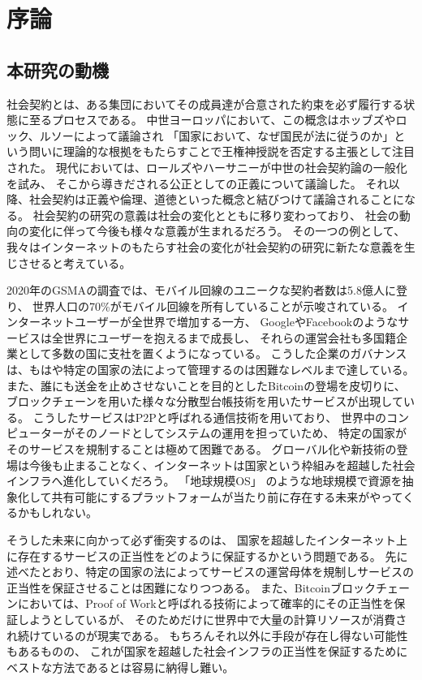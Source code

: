 \chapter{序論}
  \section{本研究の動機}
  \label{motivation}
  社会契約とは、ある集団においてその成員達が合意された約束を必ず履行する状態に至るプロセスである。
  中世ヨーロッパにおいて、この概念はホッブズやロック、ルソーによって議論され
  「国家において、なぜ国民が法に従うのか」という問いに理論的な根拠をもたらすことで王権神授説を否定する主張として注目された。
  現代においては、ロールズ\cite{rawls1971}やハーサニー\cite{harsanyi1955}が中世の社会契約論の一般化を試み、
  そこから導きだされる公正としての正義について議論した。
  それ以降、社会契約は正義や倫理、道徳といった概念と結びつけて議論されることになる。
  社会契約の研究の意義は社会の変化とともに移り変わっており、
  社会の動向の変化に伴って今後も様々な意義が生まれるだろう。
  その一つの例として、我々はインターネットのもたらす社会の変化が社会契約の研究に新たな意義を生じさせると考えている。

  2020年のGSMA\cite{gsma2020}の調査では、モバイル回線のユニークな契約者数は5.8億人に登り、
  世界人口の70\%がモバイル回線を所有していることが示唆されている。
  インターネットユーザーが全世界で増加する一方、
  Google\cite{google}やFacebook\cite{facebook}のようなサービスは全世界にユーザーを抱えるまで成長し、
  それらの運営会社も多国籍企業として多数の国に支社を置くようになっている。
  こうした企業のガバナンスは、もはや特定の国家の法によって管理するのは困難なレベルまで達している。
  また、誰にも送金を止めさせないことを目的としたBitcoin\cite{nakamoto2008bitcoin}の登場を皮切りに、
  ブロックチェーンを用いた様々な分散型台帳技術を用いたサービスが出現している。
  こうしたサービスはP2Pと呼ばれる通信技術を用いており、
  世界中のコンピューターがそのノードとしてシステムの運用を担っていため、
  特定の国家がそのサービスを規制することは極めて困難である。
  グローバル化や新技術の登場は今後も止まることなく、インターネットは国家という枠組みを超越した社会インフラへ進化していくだろう。
  「地球規模OS」\cite{saito&ikemoto2008} のような地球規模で資源を抽象化して共有可能にするプラットフォームが当たり前に存在する未来がやってくるかもしれない。

  そうした未来に向かって必ず衝突するのは、
  国家を超越したインターネット上に存在するサービスの正当性をどのように保証するかという問題である。
  先に述べたとおり、特定の国家の法によってサービスの運営母体を規制しサービスの正当性を保証させることは困難になりつつある。
  また、Bitcoinブロックチェーンにおいては、Proof of Workと呼ばれる技術によって確率的にその正当性を保証しようとしているが、
  そのためだけに世界中で大量の計算リソースが消費され続けているのが現実である。
  もちろんそれ以外に手段が存在し得ない可能性もあるものの、
  これが国家を超越した社会インフラの正当性を保証するためにベストな方法であるとは容易に納得し難い。

